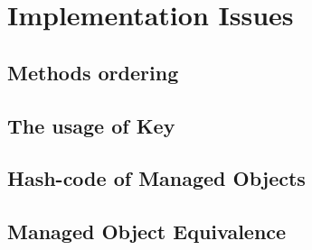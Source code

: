 \section{Implementation Issues}\label{sec:Implementation Issues}

\subsection{Methods ordering}\label{subsec:Methods ordering}


\subsection{The usage of Key}\label{subsec:The usage of Key}

\subsection{Hash-code of Managed Objects}\label{subsec:Hashcode of Managed Objects}


\subsection{Managed Object Equivalence}\label{subsec:Managed Object equivalence}
